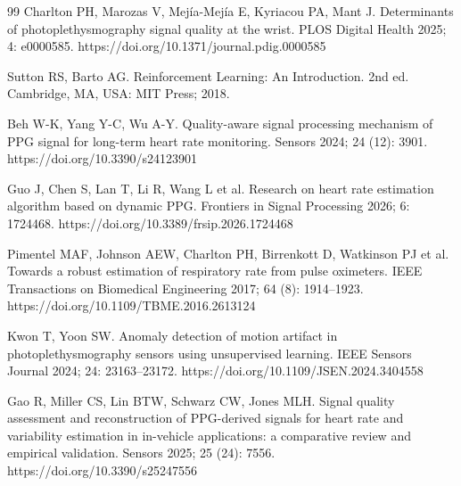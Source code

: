 \documentclass{elektr}
\begin{document}
\begin{thebibliography}{99}
Charlton PH, Marozas V, Mej\'ia-Mej\'ia E, Kyriacou PA, Mant J. Determinants of photoplethysmography signal quality at the wrist. PLOS Digital Health 2025; 4: e0000585. https://doi.org/10.1371/journal.pdig.0000585

Sutton RS, Barto AG. Reinforcement Learning: An Introduction. 2nd ed. Cambridge, MA, USA: MIT Press; 2018.

Beh W-K, Yang Y-C, Wu A-Y. Quality-aware signal processing mechanism of PPG signal for long-term heart rate monitoring. Sensors 2024; 24 (12): 3901. https://doi.org/10.3390/s24123901

Guo J, Chen S, Lan T, Li R, Wang L et al. Research on heart rate estimation algorithm based on dynamic PPG. Frontiers in Signal Processing 2026; 6: 1724468. https://doi.org/10.3389/frsip.2026.1724468

Pimentel MAF, Johnson AEW, Charlton PH, Birrenkott D, Watkinson PJ et al. Towards a robust estimation of respiratory rate from pulse oximeters. IEEE Transactions on Biomedical Engineering 2017; 64 (8): 1914--1923. https://doi.org/10.1109/TBME.2016.2613124

Kwon T, Yoon SW. Anomaly detection of motion artifact in photoplethysmography sensors using unsupervised learning. IEEE Sensors Journal 2024; 24: 23163--23172. https://doi.org/10.1109/JSEN.2024.3404558

Gao R, Miller CS, Lin BTW, Schwarz CW, Jones MLH. Signal quality assessment and reconstruction of PPG-derived signals for heart rate and variability estimation in in-vehicle applications: a comparative review and empirical validation. Sensors 2025; 25 (24): 7556. https://doi.org/10.3390/s25247556

\end{thebibliography}
\end{document}
